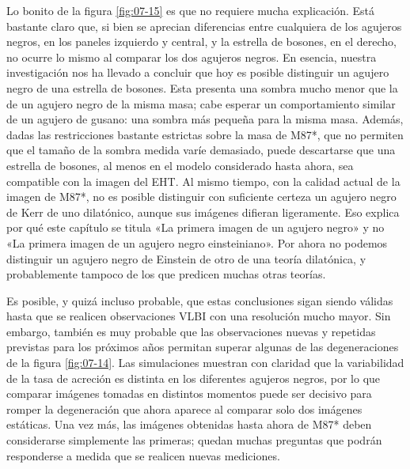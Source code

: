 Lo bonito de la figura \ref{fig:07-15} es que no requiere mucha explicación. Está bastante claro que, si bien se aprecian diferencias entre cualquiera de los agujeros negros, en los paneles izquierdo y central, y la estrella de bosones, en el derecho, no ocurre lo mismo al comparar los dos agujeros negros. En esencia, nuestra investigación nos ha llevado a concluir que hoy es posible distinguir un agujero negro de una estrella de bosones. Esta presenta una sombra mucho menor que la de un agujero negro de la misma masa; cabe esperar un comportamiento similar de un agujero de gusano: una sombra más pequeña para la misma masa. Además, dadas las restricciones bastante estrictas sobre la masa de M87*, que no permiten que el tamaño de la sombra medida varíe demasiado, puede descartarse que una estrella de bosones, al menos en el modelo considerado hasta ahora, sea compatible con la imagen del EHT. Al mismo tiempo, con la calidad actual de la imagen de M87*, no es posible distinguir con suficiente certeza un agujero negro de Kerr de uno dilatónico, aunque sus imágenes difieran ligeramente. Eso explica por qué este capítulo se titula «La primera imagen de un agujero negro» y no «La primera imagen de un agujero negro einsteiniano». Por ahora no podemos distinguir un agujero negro de Einstein de otro de una teoría dilatónica, y probablemente tampoco de los que predicen muchas otras teorías.

Es posible, y quizá incluso probable, que estas conclusiones sigan siendo válidas hasta que se realicen observaciones VLBI con una resolución mucho mayor. Sin embargo, también es muy probable que las observaciones nuevas y repetidas previstas para los próximos años permitan superar algunas de las degeneraciones de la figura \ref{fig:07-14}. Las simulaciones muestran con claridad que la variabilidad de la tasa de acreción es distinta en los diferentes agujeros negros, por lo que comparar imágenes tomadas en distintos momentos puede ser decisivo para romper la degeneración que ahora aparece al comparar solo dos imágenes estáticas. Una vez más, las imágenes obtenidas hasta ahora de M87* deben considerarse simplemente las primeras; quedan muchas preguntas que podrán responderse a medida que se realicen nuevas mediciones.

